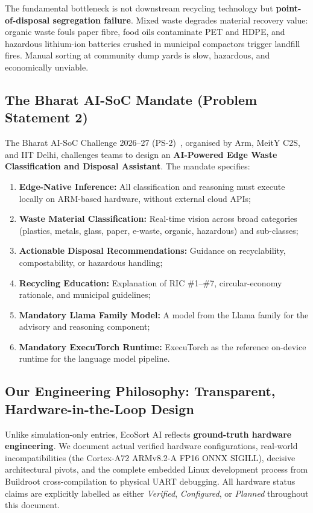 \documentclass[12pt,a4paper]{article}
\begin{document}
The fundamental bottleneck is not downstream recycling technology but
\textbf{point-of-disposal segregation failure}. Mixed waste degrades material recovery
value: organic waste fouls paper fibre, food oils contaminate PET and HDPE, and hazardous
lithium-ion batteries crushed in municipal compactors trigger landfill fires. Manual sorting
at community dump yards is slow, hazardous, and economically unviable.

\subsection{The Bharat AI-SoC Mandate (Problem Statement 2)}

The Bharat AI-SoC Challenge 2026--27 (PS-2)~\cite{arm2026bharatai}, organised by Arm,
MeitY C2S, and IIT Delhi, challenges teams to design an
\textbf{AI-Powered Edge Waste Classification and Disposal Assistant}. The mandate specifies:
\begin{enumerate}[label=\roman*.]
  \item \textbf{Edge-Native Inference:} All classification and reasoning must execute
        locally on ARM-based hardware, without external cloud APIs;
  \item \textbf{Waste Material Classification:} Real-time vision across broad categories
        (plastics, metals, glass, paper, e-waste, organic, hazardous) and sub-classes;
  \item \textbf{Actionable Disposal Recommendations:} Guidance on recyclability,
        compostability, or hazardous handling;
  \item \textbf{Recycling Education:} Explanation of RIC \#1--\#7, circular-economy
        rationale, and municipal guidelines;
  \item \textbf{Mandatory Llama Family Model:} A model from the Llama family for the
        advisory and reasoning component;
  \item \textbf{Mandatory ExecuTorch Runtime:} ExecuTorch as the reference on-device
        runtime for the language model pipeline.
\end{enumerate}

\subsection{Our Engineering Philosophy: Transparent, Hardware-in-the-Loop Design}

Unlike simulation-only entries, EcoSort AI reflects \textbf{ground-truth hardware
engineering}. We document actual verified hardware configurations, real-world
incompatibilities (the Cortex-A72 ARMv8.2-A FP16 ONNX SIGILL), decisive architectural
pivots, and the complete embedded Linux development process from Buildroot cross-compilation
to physical UART debugging. All hardware status claims are explicitly labelled as either
\textit{Verified}, \textit{Configured}, or \textit{Planned} throughout this document.
\end{document}

